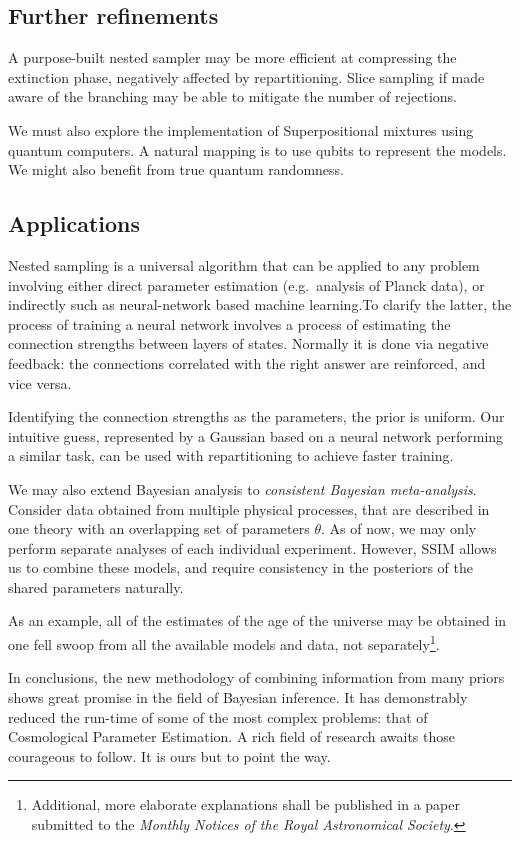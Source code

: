 \documentclass[usenatbib]{mnras}
\begin{document}
\subsection{Further refinements}\label{sec:org8314ddf}

A purpose-built nested sampler may be more efficient at compressing
the extinction phase, negatively affected by repartitioning. Slice
sampling if made aware of the branching may be able to mitigate the
number of rejections. 

We must also explore the implementation of Superpositional mixtures
using quantum computers. A natural mapping is to use qubits to
represent the models. We might also benefit from true quantum
randomness.



\subsection{Applications}\label{sec:orgc67317e}
Nested sampling is a universal algorithm that can be applied to any
problem involving either direct parameter estimation (e.g.~analysis of
Planck data), or indirectly such as neural-network based machine
learning.To clarify the latter, the process of training a neural
network involves a process of estimating the connection strengths
between layers of states. Normally it is done via negative feedback:
the connections correlated with the right answer are reinforced, and
vice versa.

Identifying the connection strengths as the parameters, the prior is
uniform. Our intuitive guess, represented by a Gaussian based on a
neural network performing a similar task, can be used with
repartitioning to achieve faster training.

We may also extend Bayesian analysis to \emph{consistent Bayesian
  meta-analysis}. Consider data obtained from multiple physical
processes, that are described in one theory with an overlapping set of
parameters $\theta$. As of now, we may only perform separate analyses
of each individual experiment. However, SSIM allows us to combine
these models, and require consistency in the posteriors of the shared
parameters naturally.

As an example, all of the estimates of the age of the universe may be
obtained in one fell swoop from all the available models and data, not
separately\footnote{Additional, more elaborate explanations shall be
  published in a paper submitted to the \emph{Monthly Notices of the
    Royal Astronomical Society}.}.

In conclusions, the new methodology of combining information from many
priors shows great promise in the field of Bayesian inference. It has
demonstrably reduced the run-time of some of the most complex
problems: that of Cosmological Parameter Estimation. A rich field of
research awaits those courageous to follow. It is ours but to point
the way.



\end{document}
